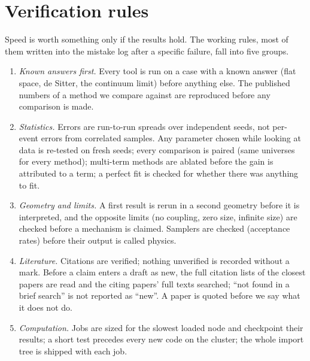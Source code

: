 \documentclass[11pt,a4paper]{article}
\begin{document}
\section{Verification rules}\label{sec:checks}
Speed is worth something only if the results hold. The working rules, most of them written into the mistake log after a specific failure, fall into five groups.
\begin{enumerate}[leftmargin=*,itemsep=2pt]
\item \emph{Known answers first.} Every tool is run on a case with a known answer (flat space, de Sitter, the continuum limit) before anything else. The published numbers of a method we compare against are reproduced before any comparison is made.
\item \emph{Statistics.} Errors are run-to-run spreads over independent seeds, not per-event errors from correlated samples. Any parameter chosen while looking at data is re-tested on fresh seeds; every comparison is paired (same universes for every method); multi-term methods are ablated before the gain is attributed to a term; a perfect fit is checked for whether there was anything to fit.
\item \emph{Geometry and limits.} A first result is rerun in a second geometry before it is interpreted, and the opposite limits (no coupling, zero size, infinite size) are checked before a mechanism is claimed. Samplers are checked (acceptance rates) before their output is called physics.
\item \emph{Literature.} Citations are verified; nothing unverified is recorded without a mark. Before a claim enters a draft as new, the full citation lists of the closest papers are read and the citing papers' full texts searched; ``not found in a brief search'' is not reported as ``new''. A paper is quoted before we say what it does not do.
\item \emph{Computation.} Jobs are sized for the slowest loaded node and checkpoint their results; a short test precedes every new code on the cluster; the whole import tree is shipped with each job.
\end{enumerate}
\end{document}
